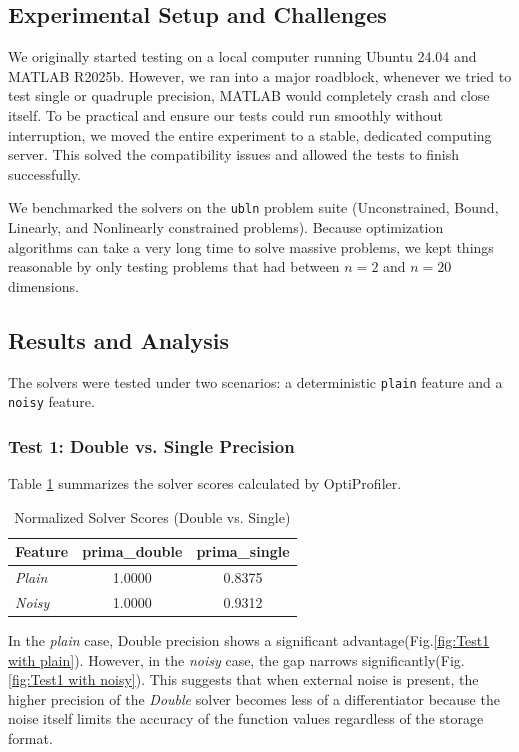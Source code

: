 \documentclass[11pt,a4paper]{article}
\begin{document}
\subsection{Experimental Setup and Challenges}
We originally started testing on a local computer running Ubuntu 24.04 and MATLAB R2025b. However, we ran into a major roadblock, whenever we tried to test single or quadruple precision, MATLAB would completely crash and close itself. To be practical and ensure our tests could run smoothly without interruption, we moved the entire experiment to a stable, dedicated computing server. This solved the compatibility issues and allowed the tests to finish successfully.

We benchmarked the solvers on the \texttt{ubln} problem suite (Unconstrained, Bound, Linearly, and Nonlinearly constrained problems). Because optimization algorithms can take a very long time to solve massive problems, we kept things reasonable by only testing problems that had between $n = 2$ and $n = 20$ dimensions.

\subsection{Results and Analysis}
The solvers were tested under two scenarios: a deterministic \texttt{plain} feature and a \texttt{noisy} feature.

\subsubsection{Test 1: Double vs. Single Precision}
Table \ref{tab:scores1} summarizes the solver scores calculated by OptiProfiler.

\begin{table}[H]
    \centering
    \caption{Normalized Solver Scores (Double vs. Single)}
    \label{tab:scores1}
    \begin{tabular}{lcc}
        \toprule
        Feature & \textbf{prima\_double} & \textbf{prima\_single} \\
        \midrule
        \textit{Plain} & 1.0000 & 0.8375 \\
        \textit{Noisy} & 1.0000 & 0.9312 \\
        \bottomrule
    \end{tabular}
\end{table}

In the \textit{plain} case, Double precision shows a significant advantage(Fig.\ref{fig:Test1 with plain}). However, in the \textit{noisy} case, the gap narrows significantly(Fig.\ref{fig:Test1 with noisy}). This suggests that when external noise is present, the higher precision of the \textit{Double} solver becomes less of a differentiator because the noise itself limits the accuracy of the function values regardless of the storage format.
\end{document}
